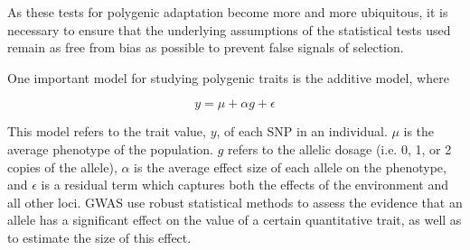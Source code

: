 \documentclass[a4paper,10pt]{article}
\newcommand{\jb}[1]{{\color{blue} (#1)} }
\begin{document}
\begin{comment}
 \jb{Hmm, I think this next bit is a bit muddled. First, you talking about ``this method of analysis'',
  but you don't really explain what the method of analysis is. The basic idea behind most tests of polygenic adaptation
  (ours included) is that selection on a quantitative trait should cause subtle but coordinated shifts in allele frequency
  across all of the many sites which contribute to variation in the trait. These shifts are too small to detect individually
  against the background of genetic drift, but if we have an annotation of which alleles contribute to a given trait,
  and which know which allele is the trait increasing allele and which is the trait decreasing allele, then we can ask whether
  it is the case that the allele frequency changes across all of these many loci are systematically correlated with the effect
  that a given allele has on the trait. This sort of pattern is extremely unlikely under genetic drift, and is also what leads
  to divergence among populations in their average phenotypes, so observing it is thought to be pretty good evidence that the
  phenotype we're looking at (or something genetically correlated with it) has been impacted by directional selection.

  Another point worth mentioning is that the potential bias is not so much with GWAS as with how GWAS data are typically
  applied in tests of polygenic adaptation. For example, GWAS does not assume anything about the relationship between
  an allele's additive effect on the trait and the frequency of the allele over time. That is an assumption of polygenic adaptation
  tests. GWAS is just a means for 1) identifying trait associated loci, and 2) estimating the size of their effects.}
\end{comment}

As these tests for polygenic adaptation become more and more ubiquitous, it is necessary to ensure that the underlying
assumptions of the statistical tests used remain as free from bias as
possible to prevent false signals of selection. 

One important model for studying polygenic traits is the additive model, where

\begin{equation}
  y = \mu + \alpha g + \epsilon
\end{equation}

This model refers to the trait value, $y$, of each SNP in an
individual. $\mu$ is the average phenotype of the population. $g$ refers to the
allelic dosage (i.e. 0, 1, or 2 copies of the allele), $\alpha$ is the average effect size
of each allele on the phenotype, and $ \epsilon $ is a residual term which captures both the
effects of the environment and all other loci. GWAS use robust statistical methods
to assess the evidence that an allele has a
significant effect on the value of a certain quantitative
trait, as well as to estimate the size of this effect.
\end{document}
